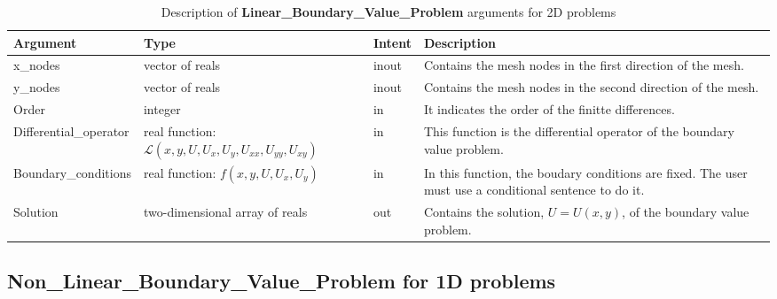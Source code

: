 \begin{table}[H]
	\begin{center}
		\begin{spacing}{1.2}
			\begin{tabular}{| l | p{5cm}| l | p{4.5cm} |}
				
				\hline
				
				\bf Argument & \bf Type & \bf Intent & \bf Description \\ \hline \hline
				
				x\_nodes & vector of reals & inout &  Contains the mesh nodes in the first direction of the mesh.  \\ \hline
				
				y\_nodes & vector of reals & inout &  Contains the mesh nodes in the second direction of the mesh.  \\ \hline
				
				Order &  integer  & in & It indicates the order of the finitte differences.  \\ \hline
				
				Differential\_operator & \raggedright real function: $\mathscr{L}\left(x, y, U,  U_x,  U_y,  U_{xx},  U_{yy},  U_{xy} \right)$ & in  & This function is the differential operator of the boundary value problem.   \\ \hline
				
				Boundary\_conditions & \raggedright real function: $f\left(x, y, U,  U_x,  U_y \right)$  & in &  In this function, the boudary conditions are fixed. The user must use a conditional sentence to do it.  \\ \hline
				
				Solution & two-dimensional array of reals  & out &  Contains the solution, $U = U(x,  y)$, of the boundary value problem. \\ \hline
				
				
			\end{tabular}
		\end{spacing}
	\end{center}
	\caption{Description of \textbf{Linear\_Boundary\_Value\_Problem} arguments for 2D problems}
\end{table}


\newpage


\subsection*{Non\_Linear\_Boundary\_Value\_Problem for 1D problems}

